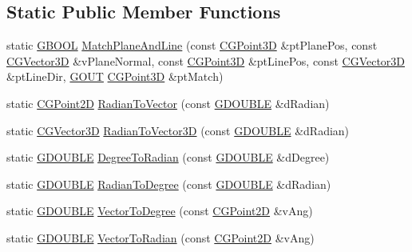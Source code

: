 \subsection*{Static Public Member Functions}
\begin{DoxyCompactItemize}
\item 
static \hyperlink{_g_types_8h_a2901915743626352a6820c5405f556dc}{G\+B\+O\+O\+L} \hyperlink{class_c_g_math_ad570310cd00417e7ad0b2cd5a0eb647c}{Match\+Plane\+And\+Line} (const \hyperlink{class_c_g_point3_d}{C\+G\+Point3\+D} \&pt\+Plane\+Pos, const \hyperlink{_g_point3_d_8h_aa7e73d39f4c991acb5a13c84b498366d}{C\+G\+Vector3\+D} \&v\+Plane\+Normal, const \hyperlink{class_c_g_point3_d}{C\+G\+Point3\+D} \&pt\+Line\+Pos, const \hyperlink{_g_point3_d_8h_aa7e73d39f4c991acb5a13c84b498366d}{C\+G\+Vector3\+D} \&pt\+Line\+Dir, \hyperlink{_g_types_8h_a0858ec221262e635612871d70ca233ad}{G\+O\+U\+T} \hyperlink{class_c_g_point3_d}{C\+G\+Point3\+D} \&pt\+Match)
\item 
static \hyperlink{class_c_g_point2_d}{C\+G\+Point2\+D} \hyperlink{class_c_g_math_aaedcd0f81b5402dcbee7713c36cd3f66}{Radian\+To\+Vector} (const \hyperlink{_g_types_8h_afd05ac85f90ee8e2a733928545462cd4}{G\+D\+O\+U\+B\+L\+E} \&d\+Radian)
\item 
static \hyperlink{_g_point3_d_8h_aa7e73d39f4c991acb5a13c84b498366d}{C\+G\+Vector3\+D} \hyperlink{class_c_g_math_a77eaf7d98149b1947fa549947a334d87}{Radian\+To\+Vector3\+D} (const \hyperlink{_g_types_8h_afd05ac85f90ee8e2a733928545462cd4}{G\+D\+O\+U\+B\+L\+E} \&d\+Radian)
\item 
static \hyperlink{_g_types_8h_afd05ac85f90ee8e2a733928545462cd4}{G\+D\+O\+U\+B\+L\+E} \hyperlink{class_c_g_math_af75f32d951fd54d5802a52d4b4cc3fb6}{Degree\+To\+Radian} (const \hyperlink{_g_types_8h_afd05ac85f90ee8e2a733928545462cd4}{G\+D\+O\+U\+B\+L\+E} \&d\+Degree)
\item 
static \hyperlink{_g_types_8h_afd05ac85f90ee8e2a733928545462cd4}{G\+D\+O\+U\+B\+L\+E} \hyperlink{class_c_g_math_af9a5673aeea1f761611d6808c69b0791}{Radian\+To\+Degree} (const \hyperlink{_g_types_8h_afd05ac85f90ee8e2a733928545462cd4}{G\+D\+O\+U\+B\+L\+E} \&d\+Radian)
\item 
static \hyperlink{_g_types_8h_afd05ac85f90ee8e2a733928545462cd4}{G\+D\+O\+U\+B\+L\+E} \hyperlink{class_c_g_math_acb3c1f04751eb60e65ac5db0df33545e}{Vector\+To\+Degree} (const \hyperlink{class_c_g_point2_d}{C\+G\+Point2\+D} \&v\+Ang)
\item 
static \hyperlink{_g_types_8h_afd05ac85f90ee8e2a733928545462cd4}{G\+D\+O\+U\+B\+L\+E} \hyperlink{class_c_g_math_ac17eda3bc5b654f926cf8de056a74514}{Vector\+To\+Radian} (const \hyperlink{class_c_g_point2_d}{C\+G\+Point2\+D} \&v\+Ang)

\end{DoxyCompactItemize}
